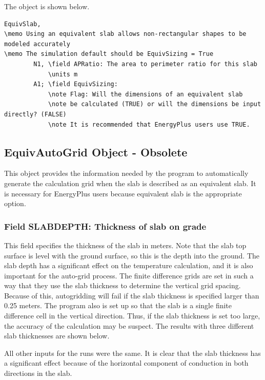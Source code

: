 The object is shown below.

\begin{lstlisting}
EquivSlab,
\memo Using an equivalent slab allows non-rectangular shapes to be modeled accurately
\memo The simulation default should be EquivSizing = True
        N1, \field APRatio: The area to perimeter ratio for this slab
            \units m
        A1; \field EquivSizing:
            \note Flag: Will the dimensions of an equivalent slab
            \note be calculated (TRUE) or will the dimensions be input directly? (FALSE)
            \note It is recommended that EnergyPlus users use TRUE.
\end{lstlisting}

\subsection{EquivAutoGrid Object - Obsolete}\label{equivautogrid-object---obsolete}

This object provides the information needed by the program to automatically generate the calculation grid when the slab is described as an equivalent slab. It is necessary for EnergyPlus users because equivalent slab is the appropriate option.

\subsubsection{Field SLABDEPTH: Thickness of slab on grade}\label{field-slabdepth-thickness-of-slab-on-grade-1}

This field specifies the thickness of the slab in meters. Note that the slab top surface is level with the ground surface, so this is the depth into the ground. The slab depth has a significant effect on the temperature calculation, and it is also important for the auto-grid process. The finite difference grids are set in such a way that they use the slab thickness to determine the vertical grid spacing. Because of this, autogridding will fail if the slab thickness is specified larger than 0.25 meters. The program also is set up so that the slab is a single finite difference cell in the vertical direction. Thus, if the slab thickness is set too large, the accuracy of the calculation may be suspect. The results with three different slab thicknesses are shown below.

All other inputs for the runs were the same. It is clear that the slab thickness has a significant effect because of the horizontal component of conduction in both directions in the slab.

